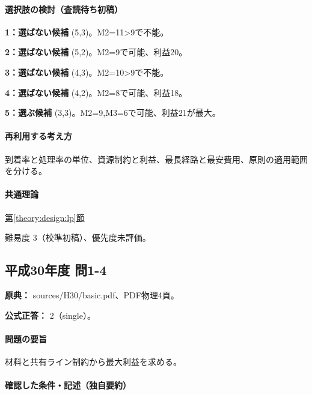 \paragraph{選択肢の検討（査読待ち初稿）}\mbox{}\par

\noindent\textbf{1：選ばない候補} (5,3)。M2=\allowbreak{}11>9で不能。\par

\noindent\textbf{2：選ばない候補} (5,2)。M2=\allowbreak{}9で可能、利益20。\par

\noindent\textbf{3：選ばない候補} (4,3)。M2=\allowbreak{}10>9で不能。\par

\noindent\textbf{4：選ばない候補} (4,2)。M2=\allowbreak{}8で可能、利益18。\par

\noindent\textbf{5：選ぶ候補} (3,3)。M2=\allowbreak{}9,M3=\allowbreak{}6で可能、利益21が最大。\par

\paragraph{再利用する考え方} 到着率と処理率の単位、資源制約と利益、最長経路と最安費用、原則の適用範囲を分ける。

\paragraph{共通理論} \hyperref[theory:design:lp]{第\ref*{theory:design:lp}節}

\par 難易度 3（校準初稿）、優先度未評価。

\subsection{平成30年度 問1-4}
\label{q:h30-reg-basic-1-4}

\noindent\textbf{原典：} sources/H30/basic.pdf、PDF物理4頁。

\textbf{公式正答：} 2（single）。

\paragraph{問題の要旨} 材料と共有ライン制約から最大利益を求める。

\paragraph{確認した条件・記述（独自要約）}\mbox{}\par

